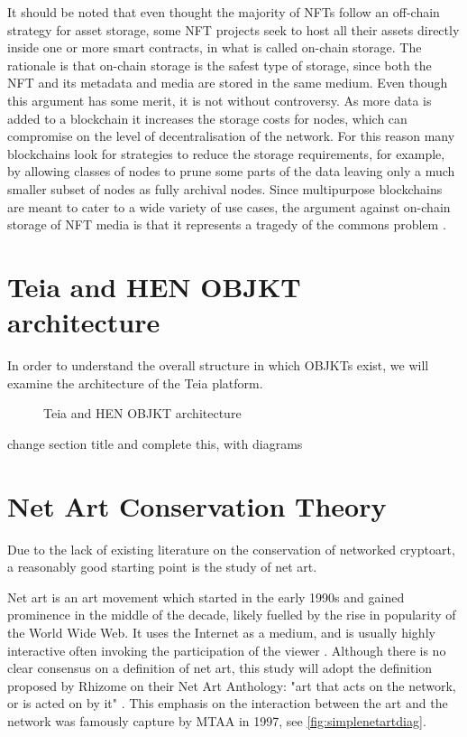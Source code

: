 It should be noted that even thought the majority of NFTs follow an off-chain strategy for asset storage, some NFT projects seek to host all their assets directly inside one or more smart contracts, in what is called on-chain storage. The rationale is that on-chain storage is the safest type of storage, since both the NFT and its metadata and media are stored in the same medium. Even though this argument has some merit, it is not without controversy. As more data is added to a blockchain it increases the storage costs for nodes, which can compromise on the level of decentralisation of the network. For this reason many blockchains look for strategies to reduce the storage requirements, for example, by allowing classes of nodes to prune some parts of the data leaving only a much smaller subset of nodes as fully archival nodes. Since multipurpose blockchains are meant to cater to a wide variety of use cases, the argument against on-chain storage of NFT media is that it represents a tragedy of the commons problem \needcite .


\section{Teia and HEN OBJKT architecture}

In order to understand the overall structure in which OBJKTs exist, we will examine the architecture of the Teia platform.

\begin{figure}[H]
    \centering
    
    \caption[Teia and HEN OBJKT architecture]{Teia and HEN OBJKT architecture}
    \label{fig:teia-arch}
\end{figure}


\todo change section title and complete this, with diagrams


\section{Net Art Conservation Theory}

Due to the lack of existing literature on the conservation of networked cryptoart, a reasonably good starting point is the study of net art.

Net art is an art movement which started in the early 1990s and gained prominence in the middle of the decade, likely fuelled by the rise in popularity of the World Wide Web. It uses the Internet as a medium, and is usually highly interactive often invoking the participation of the viewer \cite{kholeifInternet_ArtBirthWeb2023}. Although there is no clear consensus on a definition of net art, this study will adopt the definition proposed by Rhizome on their Net Art Anthology: "art that acts on the network, or is acted on by it" \cite{WhatNetArt2017}.
This emphasis on the interaction between the art and the network was famously capture by MTAA in 1997, see \autoref{fig:simplenetartdiag}.

